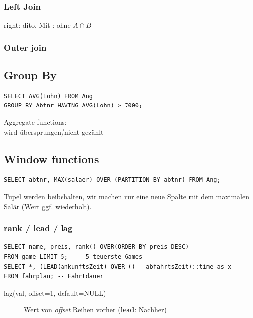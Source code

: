 \begin{multicols*}{3}
\subsubsection{Left Join}
right: dito.
Mit : ohne $A \cap B$

\subsubsection{Outer join}

\subsection{Group By}
\begin{verbatim}
SELECT AVG(Lohn) FROM Ang
GROUP BY Abtnr HAVING AVG(Lohn) > 7000;
\end{verbatim}

Aggregate functions:  \\
 wird übersprungen/nicht gezählt

\subsection{Window functions}
\begin{verbatim}
SELECT abtnr, MAX(salaer) OVER (PARTITION BY abtnr) FROM Ang;
\end{verbatim}

Tupel werden beibehalten, wir machen nur eine neue Spalte mit dem maximalen
Salär (Wert ggf. wiederholt).

\subsubsection{rank / lead / lag}
\begin{verbatim}
SELECT name, preis, rank() OVER(ORDER BY preis DESC)
FROM game LIMIT 5;  -- 5 teuerste Games
SELECT *, (LEAD(ankunftsZeit) OVER () - abfahrtsZeit)::time as x
FROM fahrplan; -- Fahrtdauer
\end{verbatim}

\begin{description}
  \item[lag(val, offset=1, default=NULL)]{Wert von \emph{offset} Reihen vorher
      (\textbf{lead}: Nachher)}
\end{description}


\end{multicols*}
